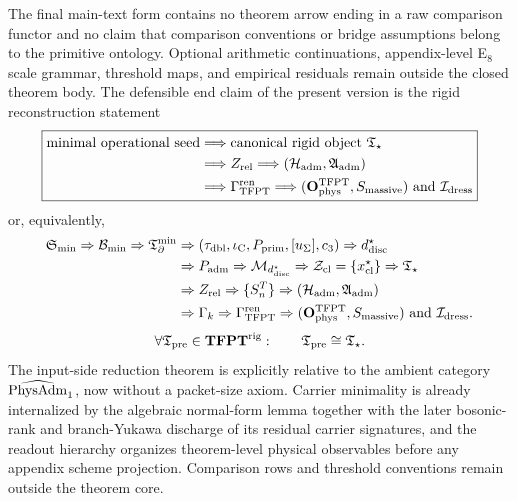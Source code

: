 The final main-text form contains no theorem arrow ending in a raw comparison functor and no claim
that comparison conventions or bridge assumptions belong to the primitive ontology. Optional
arithmetic continuations, appendix-level E$_8$ scale grammar, threshold maps, and empirical
residuals remain outside the closed theorem body. The defensible end claim of the present version
is the rigid reconstruction statement
\[
\boxed{
\begin{aligned}
\text{minimal operational seed}
&\Longrightarrow \text{canonical rigid object }\mathfrak T_{\star}\\
&\Longrightarrow Z_{\mathrm{rel}}
\Longrightarrow (\mathcal H_{\mathrm{adm}},\mathfrak A_{\mathrm{adm}})\\
&\Longrightarrow \Gamma_{\mathrm{TFPT}}^{\mathrm{ren}}
\Longrightarrow (\mathbf O_{\mathrm{phys}}^{\mathrm{TFPT}},S_{\mathrm{massive}})
\ \text{and}\ \mathcal I_{\mathrm{dress}}
\end{aligned}}
\]
or, equivalently,
\[
\begin{aligned}
\mathfrak S_{\min}
\Rightarrow
\mathcal B_{\min}
\Rightarrow
\mathfrak T_{\partial}^{\min}
&\Rightarrow
(\tau_{\mathrm{dbl}},\iota_{\mathrm C},P_{\mathrm{prim}},[u_\Sigma],c_3)
\Rightarrow
d^\star_{\mathrm{disc}}\\
&\Rightarrow
P_{\mathrm{adm}}
\Rightarrow
\mathcal M_{d^\star_{\mathrm{disc}}}
\Rightarrow
\mathcal Z_{\mathrm{cl}}=\{x^\star_{\mathrm{cl}}\}
\Rightarrow
\mathfrak T_{\star}\\
&\Rightarrow
Z_{\mathrm{rel}}
\Rightarrow
\{S_n^T\}
\Rightarrow
(\mathcal H_{\mathrm{adm}},\mathfrak A_{\mathrm{adm}})\\
&\Rightarrow
\Gamma_k
\Rightarrow
\Gamma_{\mathrm{TFPT}}^{\mathrm{ren}}
\Rightarrow
(\mathbf O_{\mathrm{phys}}^{\mathrm{TFPT}},S_{\mathrm{massive}})
\ \text{and}\ \mathcal I_{\mathrm{dress}}.
\end{aligned}
\]
\[
\forall \mathfrak T_{\mathrm{pre}}\in\mathbf{TFPT}^{\mathrm{rig}}:\qquad
\mathfrak T_{\mathrm{pre}}\cong \mathfrak T_{\star}.
\]
The input-side reduction theorem is explicitly relative to the ambient category
$\widehat{\mathrm{PhysAdm}}_1$, now without a packet-size axiom. Carrier minimality is already internalized by
the algebraic normal-form lemma together with the later bosonic-rank and branch-Yukawa discharge of
its residual carrier signatures, and
the readout hierarchy organizes theorem-level physical observables before any appendix scheme
projection. Comparison rows and threshold conventions remain outside the theorem core.

